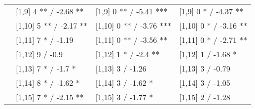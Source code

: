 \begin{table}
\begin{tabular}[t]{llll}
 & {}[1,9] 4 ** / -2.68 ** & {}[1,9] 0 ** / -5.41 *** & {}[1,9] 0 * / -4.37 **\\
 & {}[1,10] 5 ** / -2.17 ** & {}[1,10] 0 ** / -3.76 *** & {}[1,10] 0 * / -3.16 **\\
 & {}[1,11] 7 * / -1.19 & {}[1,11] 0 ** / -3.56 ** & {}[1,11] 0 * / -2.71 **\\
 & {}[1,12] 9  / -0.9 & {}[1,12] 1 * / -2.4 ** & {}[1,12] 1  / -1.68 *\\
\addlinespace
 & {}[1,13] 7 * / -1.7 * & {}[1,13] 3  / -1.26 & {}[1,13] 3  / -0.79\\
 & {}[1,14] 8 * / -1.62 * & {}[1,14] 3  / -1.62 * & {}[1,14] 3  / -1.05\\
 & {}[1,15] 7 * / -2.15 ** & {}[1,15] 3  / -1.77 * & {}[1,15] 2  / -1.28\\
\bottomrule
\end{tabular}
\end{table}
